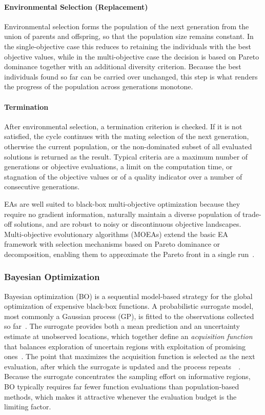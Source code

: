 \paragraph{Environmental Selection (Replacement)}
Environmental selection forms the population of the next generation from the union of parents and
offspring, so that the population size remains constant. In the single-objective case this reduces
to retaining the individuals with the best objective values, while in the multi-objective case the
decision is based on Pareto dominance together with an additional diversity criterion. Because the
best individuals found so far can be carried over unchanged, this step is what renders the progress
of the population across generations monotone.

\paragraph{Termination}
After environmental selection, a termination criterion is checked. If it is not satisfied, the cycle
continues with the mating selection of the next generation, otherwise the current population, or the
non-dominated subset of all evaluated solutions is returned as the result. Typical criteria are a
maximum number of generations or objective evaluations, a limit on the computation time, or
stagnation of the objective values or of a quality indicator over a number of consecutive
generations.

EAs are well suited to black-box multi-objective optimization because they require no gradient information, naturally maintain a diverse population of
trade-off solutions, and are robust to noisy or discontinuous objective landscapes. Multi-objective evolutionary algorithms (MOEAs) extend the basic
EA framework with selection mechanisms based on Pareto dominance or decomposition, enabling them to approximate the Pareto front in a single
run~\cite{Ishibuchi2017Performance,Li2015An}.

\subsubsection{Bayesian Optimization}
\label{subsubsec:bayesian_optimization}

Bayesian optimization (BO) is a sequential model-based strategy for the global optimization of expensive black-box functions. A probabilistic
surrogate model, most commonly a Gaussian process (GP), is fitted to the observations collected so far~\cite{Frazier2018A}. The surrogate provides both
a mean prediction and an uncertainty estimate at unobserved locations, which together define an \emph{acquisition function} that balances exploration
of uncertain regions with exploitation of promising ones~\cite{Frazier2018A,Candelieri2021A}. The point that maximizes the acquisition function is
selected as the next evaluation, after which the surrogate is updated and the process repeats~\cite{Wang2022Recent}~\cite{olson2025ax}. Because the
surrogate concentrates the sampling effort on informative regions, BO typically requires far fewer function evaluations than population-based methods,
which makes it attractive whenever the evaluation budget is the limiting factor.

